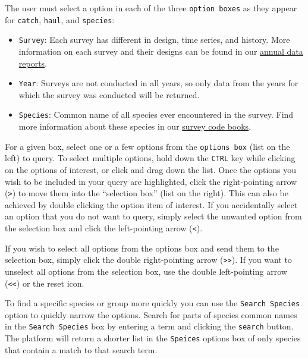 \documentclass[
  letterpaper,
  oneside,
  open=any]{scrbook}
\providecommand{\tightlist}{%
  \setlength{\itemsep}{0pt}\setlength{\parskip}{0pt}}\usepackage{longtable,booktabs,array}
\begin{document}
The user must select a option in each of the three
\texttt{option\ boxes} as they appear for \texttt{catch}, \texttt{haul},
and \texttt{species}:

\begin{itemize}
\tightlist
\item
  \texttt{Survey}: Each survey has different in design, time series, and
  history. More information on each survey and their designs can be
  found in our
  \href{https://www.fisheries.noaa.gov/alaska/science-data/groundfish-assessment-program-bottom-trawl-surveys\#data-products}{annual
  data reports}.
\item
  \texttt{Year}: Surveys are not conducted in all years, so only data
  from the years for which the survey was conducted will be returned.
\item
  \texttt{Species}: Common name of all species ever encountered in the
  survey. Find more information about these species in our
  \href{https://www.fisheries.noaa.gov/resource/document/groundfish-survey-species-code-manual-and-data-codes-manual}{survey
  code books}.
\end{itemize}

For a given box, select one or a few options from the
\texttt{options\ box} (list on the left) to query. To select multiple
options, hold down the \texttt{CTRL} key while clicking on the options
of interest, or click and drag down the list. Once the options you wish
to be included in your query are highlighted, click the right-pointing
arrow (\texttt{\textgreater{}}) to move them into the ``selection box''
(list on the right). This can also be achieved by double clicking the
option item of interest. If you accidentally select an option that you
do not want to query, simply select the unwanted option from the
selection box and click the left-pointing arrow (\texttt{\textless{}}).

If you wish to select all options from the options box and send them to
the selection box, simply click the double right-pointing arrow
(\texttt{\textgreater{}\textgreater{}}). If you want to unselect all
options from the selection box, use the double left-pointing arrow
(\texttt{\textless{}\textless{}}) or the reset icon.

To find a specific species or group more quickly you can use the
\texttt{Search\ Species} option to quickly narrow the options. Search
for parts of species common names in the \texttt{Search\ Species} box by
entering a term and clicking the \texttt{search} button. The platform
will return a shorter list in the \texttt{Speices} options box of only
species that contain a match to that search term.
\end{document}
